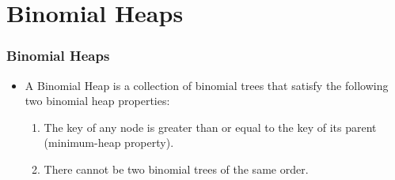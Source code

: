 \documentclass[13pt]{beamer}
\begin{document}
\section{Binomial Heaps} %
\begin{frame}
\frametitle{Binomial Heaps}
  \begin{itemize}
    \item A \alert{Binomial Heap} is a collection of binomial trees that satisfy the following two binomial heap properties:
      \begin{enumerate}
        \item The key of any node is greater than or equal to the key of its parent (minimum-heap property).
        \item There cannot be two binomial trees of the same order.
      \end{enumerate}
  \end{itemize}
\end{frame}
\end{document}
